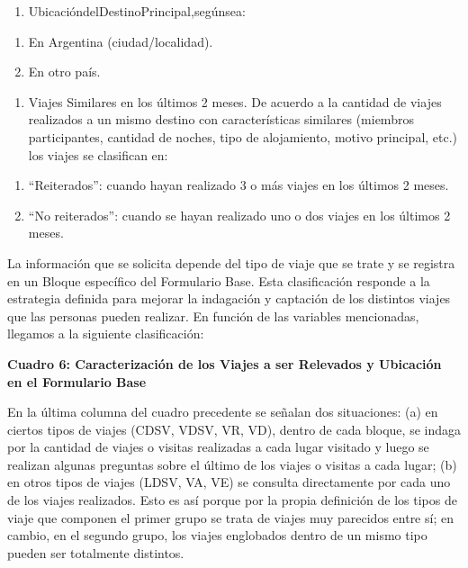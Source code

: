 \documentclass[
  openany]{book}
\providecommand{\tightlist}{%
  \setlength{\itemsep}{0pt}\setlength{\parskip}{0pt}}
\begin{document}
\begin{enumerate}
\def\labelenumi{\arabic{enumi}.}
\setcounter{enumi}{2}
\tightlist
\item
  UbicacióndelDestinoPrincipal,segúnsea:
\end{enumerate}

\begin{enumerate}
\def\labelenumi{\alph{enumi}.}
\tightlist
\item
  En Argentina (ciudad/localidad).
\item
  En otro país.
\end{enumerate}

\begin{enumerate}
\def\labelenumi{\arabic{enumi}.}
\setcounter{enumi}{3}
\tightlist
\item
  Viajes Similares en los últimos 2 meses. De acuerdo a la cantidad de viajes realizados a un mismo destino con características similares (miembros participantes, cantidad de noches, tipo de alojamiento, motivo principal, etc.) los viajes se clasifican en:
\end{enumerate}

\begin{enumerate}
\def\labelenumi{\alph{enumi}.}
\tightlist
\item
  ``Reiterados'': cuando hayan realizado 3 o más viajes en los últimos 2 meses.
\item
  ``No reiterados'': cuando se hayan realizado uno o dos viajes en los últimos 2 meses.
\end{enumerate}

La información que se solicita depende del tipo de viaje que se trate y se registra en un Bloque específico del Formulario Base.
Esta clasificación responde a la estrategia definida para mejorar la indagación y captación de los distintos viajes que las personas pueden realizar.
En función de las variables mencionadas, llegamos a la siguiente clasificación:

\textbf{Cuadro 6: Caracterización de los Viajes a ser Relevados y Ubicación en el Formulario Base}

En la última columna del cuadro precedente se señalan dos situaciones: (a) en ciertos tipos de viajes (CDSV, VDSV, VR, VD), dentro de cada bloque, se indaga por la cantidad de viajes o visitas realizadas a cada lugar visitado y luego se realizan algunas preguntas sobre el último de los viajes o visitas a cada lugar; (b) en otros tipos de viajes (LDSV, VA, VE) se consulta directamente por cada uno de los viajes realizados.
Esto es así porque por la propia definición de los tipos de viaje que componen el primer grupo se trata de viajes muy parecidos entre sí; en cambio, en el segundo grupo, los viajes englobados dentro de un mismo tipo pueden ser totalmente distintos.
\end{document}
